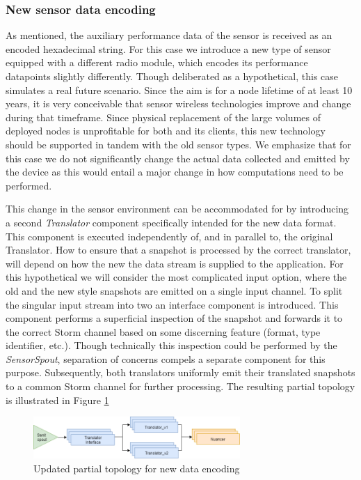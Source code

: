\subsubsection{New sensor data encoding}
As mentioned, the auxiliary performance data of the sensor is received as an encoded hexadecimal string. For this case we introduce a new type of sensor equipped with a different radio module, which encodes its performance datapoints slightly differently. Though deliberated as a hypothetical, this case simulates a real future scenario. Since the aim is for a node lifetime of at least 10 years, it is very conceivable that sensor wireless technologies improve and change during that timeframe. Since physical replacement of the large volumes of deployed nodes is unprofitable for both \nedap and its clients, this new technology should be supported in tandem with the old sensor types. We emphasize that for this case we do not significantly change the actual data collected and emitted by the device as this would entail a major change in how computations need to be performed.

This change in the sensor environment can be accommodated for by introducing a second \emph{Translator} component specifically intended for the new data format. This component is executed independently of, and in parallel to, the original Translator. How to ensure that a snapshot is processed by the correct translator, will depend on how the new the data stream is supplied to the application. For this hypothetical we will consider the most complicated input option, where the old and the new style snapshots are emitted on a single input channel. To split the singular input stream into two an interface component is introduced. This component performs a superficial inspection of the snapshot and forwards it to the correct Storm channel based on some discerning feature (format, type identifier, etc.). Though technically this inspection could be performed by the \emph{SensorSpout}, separation of concerns compels a separate component for this purpose. Subsequently, both translators uniformly emit their translated snapshots to a common Storm channel for further processing. The resulting partial topology is illustrated in Figure \ref{fig:update_encoding}

\begin{figure}
\centering
\includegraphics[width=0.7\textwidth]{resources/img/update_encoding.png}
\caption{Updated partial topology for new data encoding}
\label{fig:update_encoding}
\end{figure}

